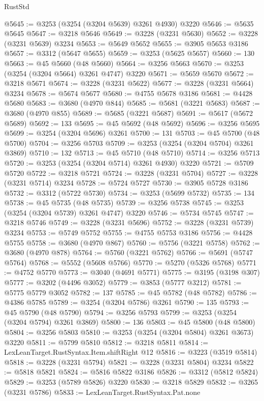 \begin{lexlean}{RustStd}
\begin{coremodule}
{\begin{coremodule}
{{{{{{{{{{{{{{{{{{{{{{{{{{{{{{{{{{{{{@5645 := @3253 (@3254 (@3204 @5639) @3261 @4930) @3220
@5646 := @5635 @5645
@5647 := @3218 @5646
@5649 := @3228 (@3231 @5630)
@5652 := @3228 (@3231 @5639) @3234
@5653 := @5649 @5652
@5655 := @3905 @5653 @3186
@5657 := @3312 (@5647 @5655)
@5659 := @3253 (@5625 @5657)
@5660 := 130
@5663 := @45 @5660 (@48 @5660)
@5664 := @3256 @5663
@5670 := @3253 (@3254 (@3204 @5664) @3261 @4747) @3220
@5671 := @5659 @5670
@5672 := @3218 @5671
@5674 := @3228 (@3231 @5622)
@5677 := @3228 (@3231 @5664) @3234
@5678 := @5674 @5677
@5680 := @4755 @5678 @3186
@5681 := @4428 @5680
@5683 := @3680 (@4970 @844)
@5685 := @5681 (@3221 @5683)
@5687 := @3680 (@4970 @855)
@5689 := @5685 (@3221 @5687)
@5691 := @5617 (@5672 @5689)
@5692 := 133
@5695 := @45 @5692 (@48 @5692)
@5696 := @3256 @5695
@5699 := @3254 (@3204 @5696) @3261
@5700 := 131
@5703 := @45 @5700 (@48 @5700)
@5704 := @3256 @5703
@5709 := @3253 (@3254 (@3204 @5704) @3261 @3869)
@5710 := 132
@5713 := @45 @5710 (@48 @5710)
@5714 := @3256 @5713
@5720 := @3253 (@3254 (@3204 @5714) @3261 @4930) @3220
@5721 := @5709 @5720
@5722 := @3218 @5721
@5724 := @3228 (@3231 @5704)
@5727 := @3228 (@3231 @5714) @3234
@5728 := @5724 @5727
@5730 := @3905 @5728 @3186
@5732 := @3312 (@5722 @5730)
@5734 := @3253 (@5699 @5732)
@5735 := 134
@5738 := @45 @5735 (@48 @5735)
@5739 := @3256 @5738
@5745 := @3253 (@3254 (@3204 @5739) @3261 @4747) @3220
@5746 := @5734 @5745
@5747 := @3218 @5746
@5749 := @3228 (@3231 @5696)
@5752 := @3228 (@3231 @5739) @3234
@5753 := @5749 @5752
@5755 := @4755 @5753 @3186
@5756 := @4428 @5755
@5758 := @3680 (@4970 @867)
@5760 := @5756 (@3221 @5758)
@5762 := @3680 (@4970 @878)
@5764 := @5760 (@3221 @5762)
@5766 := @5691 (@5747 @5764)
@5768 := @5552 (@5608 @5766)
@5770 := @5270 (@5326 @5768)
@5771 := @4752 @5770
@5773 := @3040 (@4691 @5771)
@5775 := @3195 (@3198 @307)
@5777 := @3202 (@4496 @3052)
@5779 := @3853 (@5777 @3212)
@5781 := @5775 @5779 @3052
@5782 := 137
@5785 := @45 @5782 (@48 @5782)
@5786 := @4386 @5785
@5789 := @3254 (@3204 @5786) @3261
@5790 := 135
@5793 := @45 @5790 (@48 @5790)
@5794 := @3256 @5793
@5799 := @3253 (@3254 (@3204 @5794) @3261 @3869)
@5800 := 136
@5803 := @45 @5800 (@48 @5800)
@5804 := @3256 @5803
@5810 := @3253 (@3254 (@3204 @5804) @3261 @3673) @3220
@5811 := @5799 @5810
@5812 := @3218 @5811
@5814 := LexLeanTarget.RustSyntax.Item.shiftRight @12
@5816 := @3223 (@3519 @5814)
@5818 := @3228 (@3231 @5794)
@5821 := @3228 (@3231 @5804) @3234
@5822 := @5818 @5821
@5824 := @5816 @5822 @3186
@5826 := @3312 (@5812 @5824)
@5829 := @3253 (@5789 @5826) @3220
@5830 := @3218 @5829
@5832 := @3265 (@3231 @5786)
@5833 := LexLeanTarget.RustSyntax.Pat.none
}}}}}}}}}}}}}}}}}}}}}}}}}}}}}}}}}}}}}
\end{coremodule}}
\end{coremodule}
\end{lexlean}
